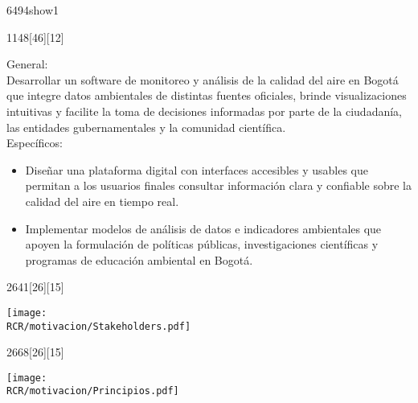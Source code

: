 \begin{NuevaPagina}{64}{94}{show1}
\begin{NuevoParrafo}{11}{48}[46][12]
		\begin{Marco}[\LineaSupC][\LineaInfC][\LineaIzqC][\LineaDerC][CBlanco]
			\begin{Objetivos}[Objetivos]
				{	{\large General:}\vspace{5pt}\\
					{\linespread{.8}\selectfont Desarrollar un software de monitoreo y análisis de la calidad del aire en Bogotá que integre datos ambientales de distintas fuentes oficiales, brinde visualizaciones intuitivas y facilite la toma de decisiones informadas por parte de la ciudadanía, las entidades gubernamentales y la comunidad científica.}\\[0.3cm]
					{\large Específicos:}
					{\begin{itemize}
							\setlength{\itemsep}{-0.5pt}
							\setlength{\parskip}{0pt}
							\setlength{\parsep}{0pt}
							\item Diseñar una plataforma digital con interfaces accesibles y usables que permitan a los usuarios finales consultar información clara y confiable sobre la calidad del aire en tiempo real.
							\item Implementar modelos de análisis de datos e indicadores ambientales que apoyen la formulación de políticas públicas, investigaciones científicas y programas de educación ambiental en Bogotá.
					\end{itemize}}
				}
			\end{Objetivos}
		\end{Marco}
	\end{NuevoParrafo}
	
	
	\begin{NuevoParrafo}{26}{41}[26][15]
		\begin{Marco}[\LineaSupC][\LineaInfC][\LineaIzqC][\LineaDerC][CBlanco]
		\subseccionC{\PVSta}%
		\centering\texttt{[image: \\RCR/motivacion/Stakeholders.pdf]}
		\end{Marco}
	\end{NuevoParrafo}

	\begin{NuevoParrafo}{26}{68}[26][15]
		\begin{Marco}[\LineaSupC][\LineaInfC][\LineaIzqC][\LineaDerC][CBlanco]
			\subseccionC{\PVPri}%
			\centering\texttt{[image: \\RCR/motivacion/Principios.pdf]}
		\end{Marco}
	\end{NuevoParrafo}
	

\end{NuevaPagina}
